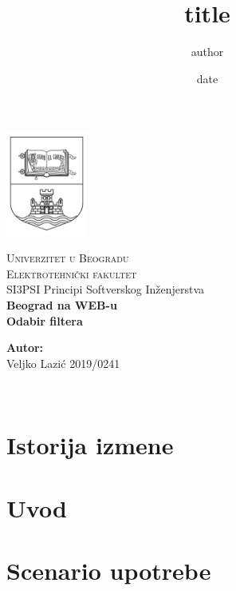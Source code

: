 \documentclass[12pt]{report}
\begin{document}
\title{title}
\author{author}
\date{date}

\begin{titlepage}
\begin{center}
    \includegraphics[width=0.2\textwidth]{logo.jpg}
\end{center}
\begin{center}
    \textsc{ \LARGE{Univerzitet u Beogradu \\}}
	\textsc{ \LARGE{Elektrotehnički fakultet\\ }}
	\textnormal{ \LARGE{SI3PSI Principi Softverskog Inženjerstva\\}}
	\vspace{30mm}
	\fontsize{10mm}{7mm}\selectfont 
    \textbf{\textup{Beograd na WEB-u}}\\
    \textbf{Odabir filtera}\\
\end{center}

\vspace{25mm}

\begin{minipage}[t]{0.47\textwidth}
	\textnormal{\large{\bf Autor:\\}}
	{\large Veljko Lazić 2019/0241}\\
\end{minipage}

\vspace{20mm}

\\

\end{titlepage}


\chapter{\color{RoyalBlue}Istorija izmene}

\chapter{\color{RoyalBlue}Uvod}

\chapter{\color{RoyalBlue}Scenario upotrebe}

\end{document}
